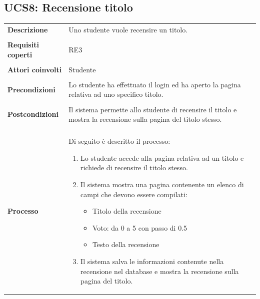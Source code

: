 \documentclass[10pt,a4paper]{report}
\begin{document}
	\subsection{UCS8: Recensione titolo}
	\begin{tabular}{lp{}}
		\textbf{Descrizione}&Uno studente vuole recensire un titolo.\\
		\\
		\textbf{Requisiti coperti}&RE3\\
		\\
		\textbf{Attori coinvolti}&Studente\\
		\\
		\textbf{Precondizioni}&Lo studente ha effettuato il login ed ha aperto la pagina relativa ad uno specifico titolo.\\
		\\
		\textbf{Postcondizioni}&Il sistema permette allo studente di recensire il titolo e mostra la recensione sulla pagina del titolo stesso.\\
		\\
		\textbf{Processo}&Di seguito è descritto il processo:
		\begin{enumerate}
			\item Lo studente accede alla pagina relativa ad un titolo e richiede di recensire il titolo stesso.
			\item Il sistema mostra una pagina contenente un elenco di campi che devono essere compilati:
			\begin{itemize}
				\item Titolo della recensione
				\item Voto: da 0 a 5 con passo di 0.5
				\item Testo della recensione
			\end{itemize}
			\item Il sistema salva le informazioni contenute nella recensione nel database e mostra la recensione sulla pagina del titolo.
		\end{enumerate}
	\end{tabular}
\end{document}
